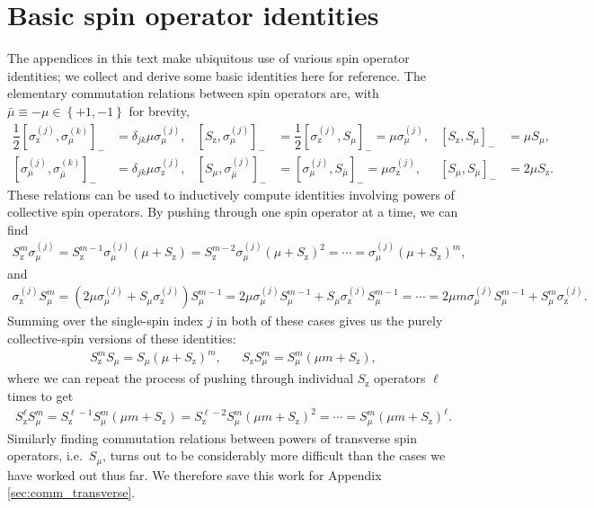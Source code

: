 \documentclass[aps,notitlepage,nofootinbib,11pt]{revtex4-1}
\newcommand{\f}[2]{\dfrac{#1}{#2}} %
\newcommand{\p}[1]{\left(#1\right)} %
\renewcommand{\sp}[1]{\left[#1\right]} %
\renewcommand{\set}[1]{\left\{#1\right\}} %
\newcommand{\z}{\text{z}}
\newcommand{\bmu}{{\bar\mu}}
\newcommand{\1}{\mathds{1}}
\begin{document}


\newpage
\appendix

\section{Basic spin operator identities}
\label{sec:identities}

The appendices in this text make ubiquitous use of various spin
operator identities; we collect and derive some basic identities here
for reference.  The elementary commutation relations between spin
operators are, with $\bmu\equiv-\mu\in\set{+1,-1}$ for brevity,
\begin{align}
  \f12 \sp{\sigma_\z^{(j)},\sigma_\mu^{(k)}}_-
  &= \delta_{jk} \mu \sigma_\mu^{(j)},
  &
  \sp{S_\z,\sigma_\mu^{(j)}}_-
  &= \f12 \sp{\sigma_\z^{(j)},S_\mu}_- = \mu \sigma_\mu^{(j)},
  &
  \sp{S_\z,S_\mu}_-
  &= \mu S_\mu,
  \label{eq:comm_z_base} \\
  \sp{\sigma_\mu^{(j)},\sigma_\bmu^{(k)}}_-
  &= \delta_{jk} \mu \sigma_\z^{(j)},
  &
  \sp{S_\mu,\sigma_\bmu^{(j)}}_-
  &= \sp{\sigma_\mu^{(j)},S_\bmu}_- = \mu \sigma_\z^{(j)},
  &
  \sp{S_\mu,S_\bmu}_-
  &= 2 \mu S_\z.
  \label{eq:comm_mu_base}
\end{align}
These relations can be used to inductively compute identities
involving powers of collective spin operators.  By pushing through one
spin operator at a time, we can find
\begin{align}
  S_\z^m \sigma_\mu^{(j)}
  = S_\z^{m-1} \sigma_\mu^{(j)} \p{\mu + S_\z}
  = S_\z^{m-2} \sigma_\mu^{(j)} \p{\mu + S_\z}^2
  = \cdots
  = \sigma_\mu^{(j)} \p{\mu + S_\z}^m,
  \label{eq:push_z_mu_Ss}
\end{align}
and
\begin{align}
  \sigma_\z^{(j)} S_\mu^m
  = \p{2\mu\sigma_\mu^{(j)} + S_\mu \sigma_\z^{(j)}} S_\mu^{m-1}
  = 2\mu\sigma_\mu^{(j)} S_\mu^{m-1} + S_\mu \sigma_\z^{(j)} S_\mu^{m-1}
  = \cdots
  = 2\mu m\sigma_\mu^{(j)} S_\mu^{m-1} + S_\mu^m \sigma_\z^{(j)}.
  \label{eq:push_z_mu_sS}
\end{align}
Summing over the single-spin index $j$ in both of these cases gives us
the purely collective-spin versions of these identities:
\begin{align}
  S_\z^m S_\mu = S_\mu \p{\mu + S_\z}^m,
  &&
  S_\z S_\mu^m = S_\mu^m \p{\mu m + S_\z},
  \label{eq:push_z_mu_single}
\end{align}
where we can repeat the process of pushing through individual $S_\z$
operators $\ell$ times to get
\begin{align}
  S_\z^\ell S_\mu^m
  = S_\z^{\ell-1} S_\mu^m \p{\mu m + S_\z}
  = S_\z^{\ell-2} S_\mu^m \p{\mu m + S_\z}^2
  = \cdots
  = S_\mu^m \p{\mu m + S_\z}^\ell.
  \label{eq:push_z_mu}
\end{align}
Similarly finding commutation relations between powers of transverse
spin operators, i.e.~$S_\mu$, turns out to be considerably more
difficult than the cases we have worked out thus far.  We therefore
save this work for Appendix \ref{sec:comm_transverse}.
\end{document}
